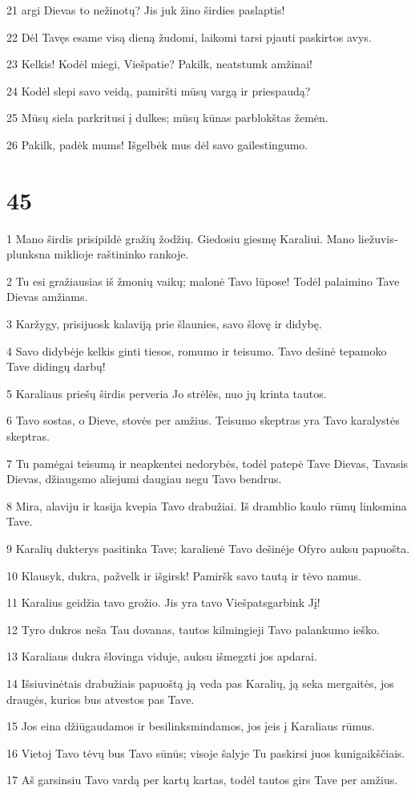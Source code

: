 \par 21 argi Dievas to nežinotų? Jis juk žino širdies paslaptis! 
\par 22 Dėl Tavęs esame visą dieną žudomi, laikomi tarsi pjauti paskirtos avys. 
\par 23 Kelkis! Kodėl miegi, Viešpatie? Pakilk, neatstumk amžinai! 
\par 24 Kodėl slepi savo veidą, pamiršti mūsų vargą ir priespaudą? 
\par 25 Mūsų siela parkritusi į dulkes; mūsų kūnas parblokštas žemėn. 
\par 26 Pakilk, padėk mums! Išgelbėk mus dėl savo gailestingumo.



\chapter{45}


\par 1 Mano širdis prisipildė gražių žodžių. Giedosiu giesmę Karaliui. Mano liežuvis­plunksna miklioje raštininko rankoje. 
\par 2 Tu esi gražiausias iš žmonių vaikų; malonė Tavo lūpose! Todėl palaimino Tave Dievas amžiams. 
\par 3 Karžygy, prisijuosk kalaviją prie šlaunies, savo šlovę ir didybę. 
\par 4 Savo didybėje kelkis ginti tiesos, romumo ir teisumo. Tavo dešinė tepamoko Tave didingų darbų! 
\par 5 Karaliaus priešų širdis perveria Jo strėlės, nuo jų krinta tautos. 
\par 6 Tavo sostas, o Dieve, stovės per amžius. Teisumo skeptras yra Tavo karalystės skeptras. 
\par 7 Tu pamėgai teisumą ir neapkentei nedorybės, todėl patepė Tave Dievas, Tavasis Dievas, džiaugsmo aliejumi daugiau negu Tavo bendrus. 
\par 8 Mira, alaviju ir kasija kvepia Tavo drabužiai. Iš dramblio kaulo rūmų linksmina Tave. 
\par 9 Karalių dukterys pasitinka Tave; karalienė Tavo dešinėje Ofyro auksu papuošta. 
\par 10 Klausyk, dukra, pažvelk ir išgirsk! Pamiršk savo tautą ir tėvo namus. 
\par 11 Karalius geidžia tavo grožio. Jis yra tavo Viešpats­garbink Jį! 
\par 12 Tyro dukros neša Tau dovanas, tautos kilmingieji Tavo palankumo ieško. 
\par 13 Karaliaus dukra šlovinga viduje, auksu išmegzti jos apdarai. 
\par 14 Išsiuvinėtais drabužiais papuoštą ją veda pas Karalių, ją seka mergaitės, jos draugės, kurios bus atvestos pas Tave. 
\par 15 Jos eina džiūgaudamos ir besilinksmindamos, jos įeis į Karaliaus rūmus. 
\par 16 Vietoj Tavo tėvų bus Tavo sūnūs; visoje šalyje Tu paskirsi juos kunigaikščiais. 
\par 17 Aš garsinsiu Tavo vardą per kartų kartas, todėl tautos girs Tave per amžius.



